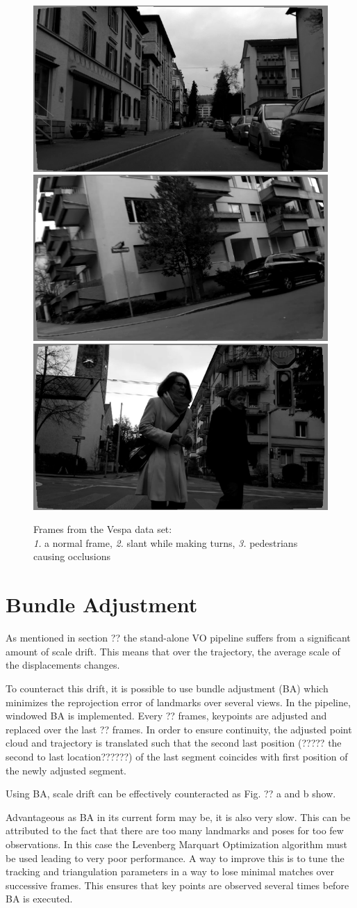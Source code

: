 \begin{figure}[htp]

\centering
\includegraphics[width=.3\textwidth]{images/vespa_0014.png}\hfill
\includegraphics[width=.3\textwidth]{images/vespa_0292.png}\hfill
\includegraphics[width=.3\textwidth]{images/vespa_1072.png}
\captionsetup{justification=centering}
\caption{Frames from the Vespa data set: \\ \emph{1.} a normal frame, \emph{2.} slant while making turns, \emph{3.} pedestrians causing occlusions}
\label{fig:vespa}

\end{figure}

\section{Bundle Adjustment}
\label{bundle adjustment}
As mentioned in section ?? the stand-alone VO pipeline suffers from a significant amount of scale drift. This means that over the trajectory, the average scale of the displacements changes. \par
To counteract this drift, it is possible to use bundle adjustment (BA) which minimizes the reprojection error of landmarks over several views. In the pipeline, windowed BA is implemented. Every ?? frames, keypoints are adjusted and replaced over the last ?? frames. In order to ensure continuity, the adjusted point cloud and trajectory is translated such that the second last position (????? the second to last location??????) of the last segment coincides with first position of the newly adjusted segment. \par
Using BA, scale drift can be effectively counteracted as Fig. ?? a and b show. \par
Advantageous as BA in its current form may be, it is also very slow. This can be attributed to the fact that there are too many landmarks and poses for too few observations. In this case the Levenberg Marquart Optimization algorithm must be used leading to very poor performance. A way to improve this is to tune the tracking and triangulation parameters in a way to lose minimal matches over successive frames. This ensures that key points are observed several times before BA is executed. 

